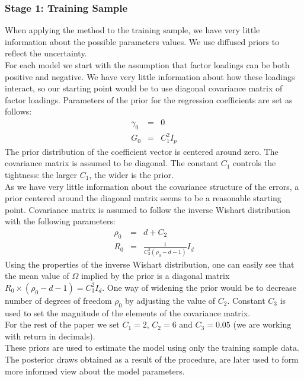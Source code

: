 \documentclass[12pt]{article}
\begin{document}
\subsubsection{Stage 1: Training Sample}
When applying the method to the training sample, we have very little information about the possible parameters values. We use diffused priors to reflect the uncertainty.\\
For each model we start with the assumption that factor loadings can be both positive and negative. We have very little information about how these loadings interact, so our starting point would be to use diagonal covariance matrix of factor loadings. 
Parameters of the prior for the regression coefficients are set as follows:
\begin{eqnarray*}
	\gamma_{0} &=& 0 \\ 
	G_{0} &=& C_{1}^{2}I_{p} 
\end{eqnarray*}
The prior distribution of the coefficient vector is centered around zero. The covariance matrix is assumed to be diagonal. The constant $C_{1}$ controls the tightness: the larger $C_{1}$, the wider is the prior.\\
As we have very little information about the covariance structure of the errors, a prior centered around the diagonal matrix seems to be a reasonable starting point. Covariance matrix is assumed to follow the inverse Wishart distribution with the following parameters:
\begin{eqnarray*}
	\rho_{0} &=& d + C_{2} \\ 
	R_{0} &=& \frac{1}{C_{3}^{2} (\rho_{0}-d-1)}I_{d}
\end{eqnarray*}
Using the properties of the inverse Wishart distribution, one can easily see that the mean value of $\Omega$ implied by the prior is a diagonal matrix $R_{0} \times(\rho_{0} - d- 1) = C_{3}^{2}I_{d}$. One way of widening the prior would be to decrease number of degrees of freedom $\rho_{0}$ by adjusting the value of $C_2$. Constant $C_{3}$ is used to set the magnitude of the elements of the covariance matrix. \\
For the rest of the paper we set $C_{1} = 2$, $C_{2} = 6$ and $C_{3} = 0.05$ (we are working with return in decimals).\\
These priors are used to estimate the model using only the training sample data. The posterior draws obtained as a result of the procedure, are later used to form more informed view about the model parameters.
\end{document}
